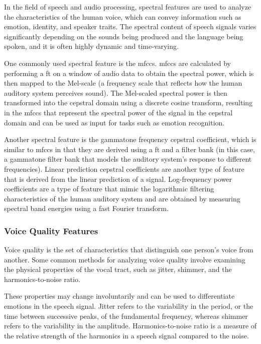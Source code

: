 In the field of speech and audio processing, spectral features are used to analyze the characteristics of the human voice, which can convey information such as emotion, identity, and speaker traits.  The spectral content of speech signals varies significantly depending on the sounds being produced and the language being spoken, and it is often highly dynamic and time-varying.

One commonly used spectral feature is the \ac{mfccs}. \ac{mfccs} are calculated by performing a \ac{ft} on a window of audio data to obtain the spectral power, which is then mapped to the Mel-scale (a frequency scale that reflects how the human auditory system perceives sound). The Mel-scaled spectral power is then transformed into the cepstral domain using a discrete cosine transform, resulting in the \ac{mfccs} that represent the spectral power of the signal in the cepstral domain and can be used as input for tasks such as emotion recognition.

Another spectral feature is the gammatone frequency cepstral coefficient, which is similar to \ac{mfccs} in that they are derived using a \ac{ft} and a filter bank (in this case, a gammatone filter bank that models the auditory system's response to different frequencies). Linear prediction cepstral coefficients are another type of feature that is derived from the linear prediction of a signal. Log-frequency power coefficients are a type of feature that mimic the logarithmic filtering characteristics of the human auditory system and are obtained by measuring spectral band energies using a fast Fourier transform. 


\subsubsection{Voice Quality Features}

Voice quality is the set of characteristics that distinguish one person's voice from another. Some common methods for analyzing voice quality involve examining the physical properties of the vocal tract, such as jitter, shimmer, and the harmonics-to-noise ratio.

These properties may change involuntarily and can be used to differentiate emotions in the speech signal. Jitter refers to the variability in the period, or the time between successive peaks, of the fundamental frequency, whereas shimmer refers to the variability in the amplitude. Harmonics-to-noise ratio is a measure of the relative strength of the harmonics in a speech signal compared to the noise.

